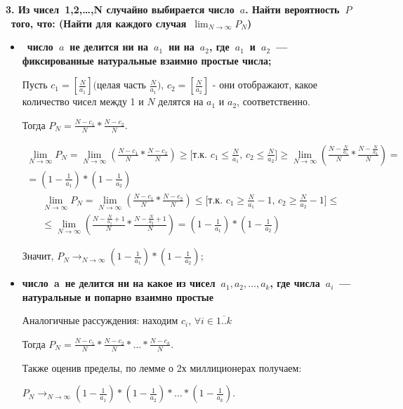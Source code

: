 \documentclass{article}
\begin{document}
\noindent \textbf{3. Из чисел 1,2,…,N случайно выбирается число $a$. Найти вероятность $P$ того, что: (Найти для каждого случая $\lim_{N \to \infty }P_{N}$)}
\begin{itemize}
\item  \textbf{число $a$ не делится ни на $a_{1}$ ни на $a_{2}$, где $a_{1}$ и $a_{2}$ — фиксированные натуральные взаимно простые числа;}

Пусть $c_1 = [\frac{N}{a_1}] \text{(целая часть $\frac{N}{a_1}$), } c_2 = [\frac{N}{a_2}]$ - они отображают, какое количество чисел между 1 и $N$ делятся на $a_1$ и $a_2$, соответственно.

Тогда $P_N = \frac{N - c_1}{N} * \frac{N - c_2}{N}$.

\begin{align*}
\lim_{N \to \infty}P_{N} = \lim_{N \to \infty} (\frac{N - c_1}{N} * \frac{N - c_2}{N}) \geq \text{[т.к. $c_1 \leq \frac{N}{a_1}$, $c_2 \leq \frac{N}{a_2}$]} \geq \lim_{N \to \infty} (\frac{N - \frac{N}{a_1}}{N} * \frac{N - \frac{N}{a_2}}{N}) = \\
= (1 - \frac{1}{a_1}) * (1 - \frac{1}{a_2})
\end{align*}
\begin{align*}
\lim_{N \to \infty}P_{N} = \lim_{N \to \infty} (\frac{N - c_1}{N} * \frac{N - c_2}{N}) \leq \text{[т.к. $c_1 \geq \frac{N}{a_1} - 1$, $c_2 \geq \frac{N}{a_2} - 1$]} \leq \\ 
\leq \lim_{N \to \infty} (\frac{N - \frac{N}{a_1} + 1}{N} * \frac{N - \frac{N}{a_2} + 1}{N}) = (1 - \frac{1}{a_1}) * (1 - \frac{1}{a_2})
\end{align*}

Значит, $P_N \rightarrow_{N \to \infty} (1 - \frac{1}{a_1}) * (1 - \frac{1}{a_2})$;

\item  \textbf{число a не делится ни на какое из чисел $a_{1}, a_{2}, …, a_{k}$, где числа $a_{i}$ — натуральные и попарно взаимно простые}

Аналогичные рассуждения: находим $c_i$, $\forall i \in \overline{1..k}$

Тогда $P_N = \frac{N - c_1}{N} * \frac{N - c_2}{N} * \ldots * \frac{N - c_k}{N}$.

Также оценив пределы, по лемме о 2х миллиционерах получаем: 

$P_N \rightarrow_{N \to \infty} (1 - \frac{1}{a_1}) * (1 - \frac{1}{a_2}) * \ldots * (1- \frac{1}{a_k})$.
\end{itemize}
\end{document}
